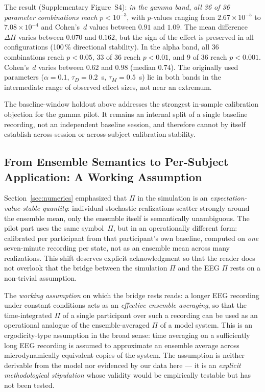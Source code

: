 ﻿\documentclass[11pt,a4paper]{article}
\theoremstyle{plain}
\theoremstyle{definition}
\theoremstyle{remark}
\begin{document}
The result (Supplementary Figure~S4): \emph{in the gamma band, all 36 of 36 parameter combinations reach $p < 10^{-3}$}, with $p$-values ranging from $2.67 \times 10^{-5}$ to $7.08 \times 10^{-4}$ and Cohen's~$d$ values between $0.91$ and $1.09$. The mean difference $\Delta\Pi$ varies between $0.070$ and $0.162$, but the sign of the effect is preserved in all configurations (100\,\% directional stability). In the alpha band, all 36 combinations reach $p < 0.05$, 33 of 36 reach $p < 0.01$, and 9 of 36 reach $p < 0.001$. Cohen's~$d$ varies between $0.62$ and $0.98$ (median $0.74$). The originally used parameters ($\alpha = 0.1$, $\tau_D = 0.2$~s, $\tau_M = 0.5$~s) lie in both bands in the intermediate range of observed effect sizes, not near an extremum.

The baseline-window holdout above addresses the strongest in-sample calibration objection for the gamma pilot. It remains an internal split of a single baseline recording, not an independent baseline session, and therefore cannot by itself establish across-session or across-subject calibration stability.

\subsection{From Ensemble Semantics to Per-Subject Application: A Working Assumption}
\label{sec:pilot-bridge}

Section~\ref{sec:numerics} emphasized that $\Pi$ in the simulation is an \emph{expectation-value-stable quantity}: individual stochastic realizations scatter strongly around the ensemble mean, only the ensemble itself is semantically unambiguous. The pilot part uses the same symbol~$\Pi$, but in an operationally different form: calibrated per participant from that participant's own baseline, computed on \emph{one} seven-minute recording per state, not as an ensemble mean across many realizations. This shift deserves explicit acknowledgment so that the reader does not overlook that the bridge between the simulation $\Pi$ and the EEG $\Pi$ rests on a non-trivial assumption.

The \emph{working assumption} on which the bridge rests reads: a longer EEG recording under constant conditions acts as an \emph{effective ensemble averaging}, so that the time-integrated $\Pi$ of a single participant over such a recording can be used as an operational analogue of the ensemble-averaged $\Pi$ of a model system. This is an ergodicity-type assumption in the broad sense: time averaging on a sufficiently long EEG recording is assumed to approximate an ensemble average across microdynamically equivalent copies of the system. The assumption is neither derivable from the model nor evidenced by our data here --- it is an \emph{explicit methodological stipulation} whose validity would be empirically testable but has not been tested.
\end{document}
